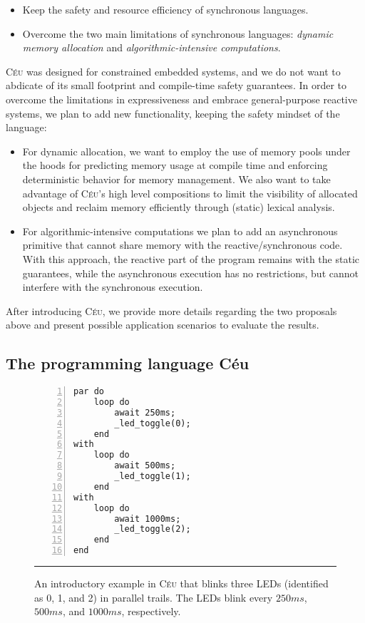 \documentclass[pdftex,12pt,a4paper]{article}
\newcommand{\CEU}{\textsc{C\'{e}u}\xspace}
\begin{document}
\begin{itemize}
    \item Keep the safety and resource efficiency of synchronous languages.
    \item Overcome the two main limitations of synchronous languages:
            \emph{dynamic memory allocation}
            and
            \emph{algorithmic-intensive computations}.
\end{itemize}

\CEU was designed for constrained embedded systems, and we do not want to 
abdicate of its small footprint and compile-time safety guarantees.
%
In order to overcome the limitations in expressiveness and embrace 
general-purpose reactive systems, we plan to add new functionality, keeping the 
safety mindset of the language:

\begin{itemize}
    \item For dynamic allocation, we want to employ the use of memory pools 
    under the hoods for predicting memory usage at compile time and enforcing
    deterministic behavior for memory management.
    We also want to take advantage of \CEU's high level compositions to limit 
    the visibility of allocated objects and reclaim memory efficiently through 
(static) lexical analysis.
    \item For algorithmic-intensive computations we plan to add an asynchronous 
primitive that cannot share memory with the reactive/synchronous code.
    With this approach, the reactive part of the program remains with the 
static guarantees, while the asynchronous execution has no restrictions, but 
cannot interfere with the synchronous execution.
\end{itemize}

After introducing \CEU, we provide more details regarding the two proposals 
above and present possible application scenarios to evaluate the results.

\subsection{The programming language C\'eu}

\begin{figure}[t]
\begin{lstlisting}[numbers=left,xleftmargin=3em]
par do
    loop do
        await 250ms;
        _led_toggle(0);
    end
with
    loop do
        await 500ms;
        _led_toggle(1);
    end
with
    loop do
        await 1000ms;
        _led_toggle(2);
    end
end
\end{lstlisting}
\rule{13.8cm}{0.37pt}
\caption{
    An introductory example in \CEU that blinks three LEDs (identified as 0, 1, 
    and 2) in parallel trails.
    The LEDs blink every $250ms$, $500ms$, and $1000ms$, respectively.
    \label{lst.blink}
}
\end{figure}
\end{document}
